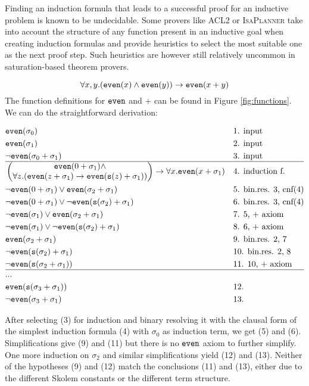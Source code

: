 \normalsize

Finding an induction formula that leads to a successful proof for an inductive problem is known to be undecidable. Some provers like \textsc{ACL2} or \textsc{IsaPlanner} take into account the structure of any function present in an inductive goal when creating induction formulas and provide heuristics to select the most suitable one as the next proof step. Such heuristics are however still relatively uncommon in saturation-based theorem provers.
\begin{example}\label{ex:1}
$$\forall x,y. (\mathtt{even}(x)\land \mathtt{even}(y))\rightarrow \mathtt{even}(x+y)$$
The function definitions for $\mathtt{even}$ and + can be found in Figure \ref{fig:functions}. We can do the straightforward derivation:
\footnotesize
\begin{mdframed}[usetwoside=false,innertopmargin=-5pt,skipabove=0pt,skipbelow=0pt]\begin{equation}\nonumber\begin{aligned}
&\mathtt{even}(\sigma_0)&&\text{1. input}\\
&\mathtt{even}(\sigma_1)&&\text{2. input}\\
&\neg\mathtt{even}(\sigma_0+\sigma_1)&&\text{3. input}\\
\hline
&\begin{pmatrix}\mathtt{even}(0+\sigma_1)\land\\\forall z.(\mathtt{even}(z+\sigma_1)\rightarrow\mathtt{even}(\mathtt{s}(z)+\sigma_1))\end{pmatrix}\rightarrow \forall x.\mathtt{even}(x+\sigma_1)&&\text{4. induction f.}\\
&\neg\mathtt{even}(0+\sigma_1)\lor \mathtt{even}(\sigma_2+\sigma_1)&&\text{5. bin.res. 3, cnf(4)}\\
&\neg\mathtt{even}(0+\sigma_1)\lor \neg\mathtt{even}(\mathtt{s}(\sigma_2)+\sigma_1)&&\text{6. bin.res. 3, cnf(4)}\\
&\neg\mathtt{even}(\sigma_1)\lor \mathtt{even}(\sigma_2+\sigma_1)&&\text{7. 5, + axiom}\\
&\neg\mathtt{even}(\sigma_1)\lor \neg\mathtt{even}(\mathtt{s}(\sigma_2)+\sigma_1)&&\text{8. 6, + axiom}\\
&\mathtt{even}(\sigma_2+\sigma_1)&&\text{9. bin.res. 2, 7}\\
&\neg\mathtt{even}(\mathtt{s}(\sigma_2)+\sigma_1)&&\text{10. bin.res. 2, 8}\\
&\neg\mathtt{even}(\mathtt{s}(\sigma_2+\sigma_1))&&\text{11. 10, + axiom}\\
\hline
&...\\
&\mathtt{even}(\mathtt{s}(\sigma_3+\sigma_1))&&\text{12.}\\
&\neg\mathtt{even}(\sigma_3+\sigma_1)&&\text{13.}
\end{aligned}\end{equation}\end{mdframed}
\normalsize
After selecting (3) for induction and binary resolving it with the clausal form of the simplest induction formula (4) with $\sigma_0$ as induction term, we get (5) and (6). Simplifications give (9) and (11) but there is no $\mathtt{even}$ axiom to further simplify. One more induction on $\sigma_2$ and similar simplifications yield (12) and (13). Neither of the hypotheses (9) and (12) match the conclusions (11) and (13), either due to the different Skolem constants or the different term structure.


\end{example}
